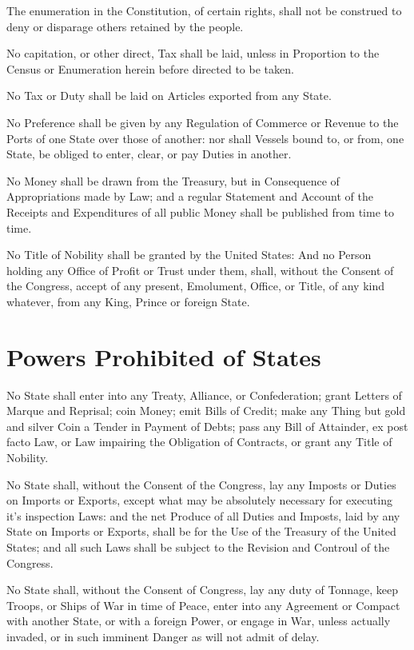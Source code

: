 \documentclass{constitution}
\begin{document}
The enumeration in the Constitution, of certain rights,
shall not be construed to deny or disparage others retained by the people.

No capitation, or other direct, Tax shall be laid,
unless in Proportion to the Census or Enumeration herein before directed to be taken.

No Tax or Duty shall be laid on Articles exported from any State.

No Preference shall be given by any Regulation of Commerce or Revenue
to the Ports of one State over those of another:
nor shall Vessels bound to, or from, one State,
be obliged to enter, clear, or pay Duties in another.

No Money shall be drawn from the Treasury,
but in Consequence of Appropriations made by Law;
and a regular Statement and Account
of the Receipts and Expenditures of all public Money
shall be published from time to time.

No Title of Nobility shall be granted by the United States:
And no Person holding any Office of Profit or Trust under them, shall,
without the Consent of the Congress,
accept of any present, Emolument, Office, or Title, of any kind whatever,
from any King, Prince or foreign State.

\section{Powers Prohibited of States}
No State shall enter into any Treaty, Alliance, or Confederation;
grant Letters of Marque and Reprisal;
coin Money;
emit Bills of Credit;
make any Thing but gold and silver Coin a Tender in Payment of Debts;
pass any Bill of Attainder,
ex post facto Law,
or Law impairing the Obligation of Contracts,
or grant any Title of Nobility.

No State shall, without the Consent of the Congress,
lay any Imposts or Duties on Imports or Exports,
except what may be absolutely necessary for executing it's inspection Laws:
and the net Produce of all Duties and Imposts,
laid by any State on Imports or Exports,
shall be for the Use of the Treasury of the United States;
and all such Laws shall be subject to the Revision and Controul of the Congress.

No State shall, without the Consent of Congress,
lay any duty of Tonnage,
keep Troops, or Ships of War in time of Peace,
enter into any Agreement or Compact with another State, or with a foreign Power,
or engage in War, unless actually invaded,
or in such imminent Danger as will not admit of delay.
\end{document}
